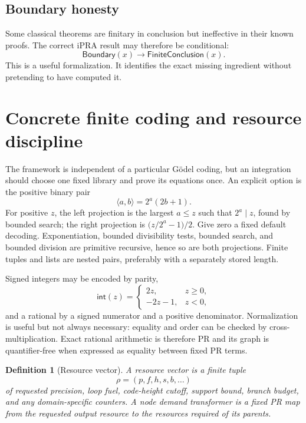 \documentclass[11pt]{article}
\newtheorem{definition}[theorem]{Definition}
\newcommand{\pair}[2]{\langle #1,#2\rangle}
\begin{document}
\subsection{Boundary honesty}

Some classical theorems are finitary in conclusion but ineffective in their
known proofs.  The correct iPRA result may therefore be conditional:
\[
  \mathsf{Boundary}(x)\longrightarrow \mathsf{FiniteConclusion}(x).
\]
This is a useful formalization.  It identifies the exact missing ingredient
without pretending to have computed it.

\section{Concrete finite coding and resource discipline}
\label{sec:coding}

The framework is independent of a particular Gödel coding, but an integration
should choose one fixed library and prove its equations once.  An explicit
option is the positive binary pair
\[
  \pair{a}{b}=2^a(2b+1).
\]
For positive \(z\), the left projection is the largest \(a\le z\) such that
\(2^a\mid z\), found by bounded search; the right projection is
\(\bigl(z/2^a-1\bigr)/2\).  Give zero a fixed default decoding.  Exponentiation,
bounded divisibility tests, bounded search, and bounded division are primitive
recursive, hence so are both projections.  Finite tuples and lists are nested
pairs, preferably with a separately stored length.

Signed integers may be encoded by parity,
\[
  \mathsf{int}(z)=
  \begin{cases}
  2z,&z\ge 0,\\
  -2z-1,&z<0,
  \end{cases}
\]
and a rational by a signed numerator and a positive denominator.  Normalization
is useful but not always necessary: equality and order can be checked by
cross-multiplication.  Exact rational arithmetic is therefore PR and its graph
is quantifier-free when expressed as equality between fixed PR terms.

\begin{definition}[Resource vector]
A resource vector is a finite tuple
\[
  \rho=(p,f,h,s,b,\ldots)
\]
of requested precision, loop fuel, code-height cutoff, support bound, branch
budget, and any domain-specific counters.  A node demand transformer is a fixed
PR map from the requested output resource to the resources required of its
parents.
\end{definition}
\end{document}

